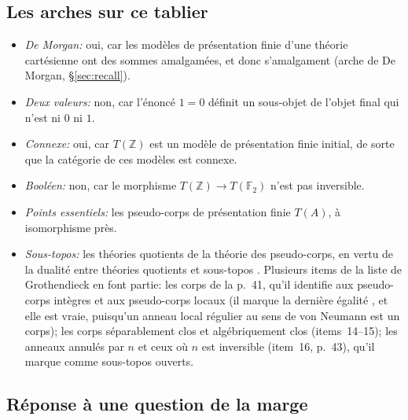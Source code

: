\subsection{Les arches sur ce tablier}

\begin{itemize}
\item \emph{De Morgan:} oui, car les modèles de présentation finie d'une théorie cartésienne ont des sommes amalgamées, et donc s'amalgament (arche de De Morgan, \S\ref{sec:recall}).
\item \emph{Deux valeurs:} non, car l'énoncé $1=0$ définit un sous-objet de l'objet final qui n'est ni $0$ ni $1$.
\item \emph{Connexe:} oui, car $T(\mathbb Z)$ est un modèle de présentation finie initial, de sorte que la catégorie de ces modèles est connexe.
\item \emph{Booléen:} non, car le morphisme $T(\mathbb Z)\to T(\mathbb F_2)$ n'est pas inversible.
\item \emph{Points essentiels:} les pseudo-corps de présentation finie $T(A)$, à isomorphisme près.
\item \emph{Sous-topos:} les théories quotients de la théorie des pseudo-corps, en vertu de la dualité entre théories quotients et sous-topos \cite{caramello-tst}. Plusieurs items de la liste de Grothendieck en font partie: les corps de la p.~41, qu'il identifie aux pseudo-corps intègres et aux pseudo-corps locaux (il marque la dernière égalité , et elle est vraie, puisqu'un anneau local régulier au sens de von Neumann est un corps); les corps séparablement clos et algébriquement clos (items~14--15); les anneaux annulés par $n$ et ceux où $n$ est inversible (item~16, p.~43), qu'il marque comme sous-topos ouverts.
\end{itemize}

\subsection{Réponse à une question de la marge}

